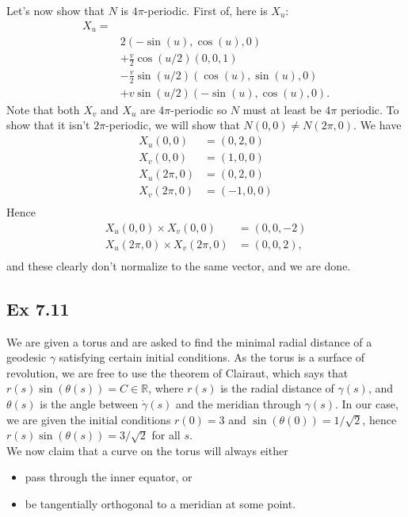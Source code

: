 \documentclass{article}
\theoremstyle{definition}
\newcommand{\R}{\mathbb{R}}
\begin{document}
Let's now show that $N$ is $4\pi$-periodic. First of, here is $X_u$:
\begin{align*}
	X_u
	=& \\
	 &2(-\sin(u), \cos(u), 0)  \\
	 &+
	\frac{v}{2}\cos(u/2)(0, 0, 1) \\
	 &-
	\frac{v}{2}\sin(u/2)(\cos(u), \sin(u), 0) \\
	 &+
	v \sin(u/2) (-\sin(u), \cos(u), 0).
\end{align*}
Note that both $X_v$ and $X_u$ are $4\pi$-periodic so $N$ must at least be
$4\pi$ periodic. To show that it isn't $2\pi$-periodic, we will show that $N(0,
0) \not = N(2\pi, 0)$. We have 
\begin{align*}
	X_u(0, 0) &= (0, 2, 0) \\
	X_v(0, 0) &= (1, 0, 0) \\
	X_u(2\pi, 0) &= (0, 2, 0) \\
	X_v(2\pi, 0) &= (-1, 0, 0) \\
\end{align*} 
Hence 
\begin{align*}
	X_u(0, 0) \times X_v(0, 0)
	&=
	(0, 0, -2) \\
	X_u(2\pi, 0) \times X_v(2\pi, 0)
	&=
	(0, 0, 2), \\
\end{align*}
and these clearly don't normalize to the same vector, and we are done.

\subsection*{Ex 7.11}

We are given a torus and are asked to find the minimal radial distance of a
geodesic $\gamma$ satisfying certain initial conditions. As the torus is a
surface of revolution, we are free to use the theorem of Clairaut, which says
that $r(s)\sin(\theta(s)) = C \in \R$, where $r(s)$ is the radial distance of
$\gamma(s)$, and $\theta(s)$ is the angle between $\dot\gamma(s)$ and the
meridian through $\gamma(s)$. In our case, we are given the initial conditions
$r(0) = 3$ and $\sin(\theta(0)) = 1/\sqrt{2}$, hence $r(s)\sin(\theta(s)) =
3/\sqrt{2}$ for all $s$. \\

We now claim that a curve on the torus will always either
\begin{itemize}
	\item pass through the inner equator, or
	\item be tangentially orthogonal to a meridian at some point.
\end{itemize}
\end{document}
